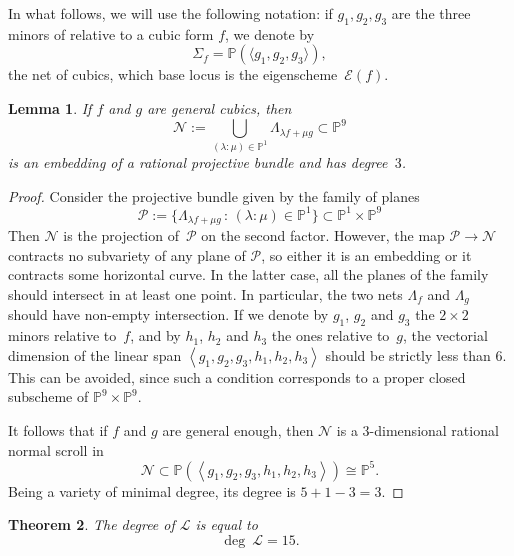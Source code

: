 \documentclass{amsart}
\theoremstyle{plain}
\newtheorem{lemma}{Lemma}[section]
\newtheorem{theorem}[lemma]{Theorem}
\theoremstyle{definition}
\newcommand{\p}{\mathbb{P}}
\newcommand{\Eig}[1]{\mathcal{E}\!\left( {#1} \right)}
\begin{document}
In what follows, we will use the following notation: if $g_1, g_2, g_3$ are the three minors of  relative
to a cubic form $f$, we denote by
$$
\Sigma_f =\p( \langle g_1, g_2, g_3 \rangle),
$$
the net of cubics, which base locus is the eigenscheme~$\Eig{f}$.
%
\begin{lemma}
\label{lemma:scroll}
 If $f$ and $g$ are general cubics, then
 \[
   \mathcal{N} := \bigcup_{(\lambda : \mu) \in \p^1} \Lambda_{\lambda f + \mu g} \subset \p^9
 \]
 is an embedding of a rational projective bundle and has degree~$3$.
\end{lemma}
\begin{proof}
Consider the projective bundle given by the family of planes
%
\[
{\mathcal P} := \{ \Lambda_{\lambda f + \mu g} \, : \, (\lambda: \mu)\in \p^1 \} \subset \p^1 \times \p^9
\]
%
Then $\mathcal{N}$ is the projection of~$\mathcal{P}$ on the second factor.
However, the map ${\mathcal P} \to {\mathcal N}$ contracts no subvariety of any plane of ${\mathcal P}$, so either it is an embedding or it contracts some horizontal curve. In the latter case, all the planes of the family should intersect in at least one point. In particular, the two nets $\Lambda_f$ and $\Lambda_g$ should have non-empty intersection.
If we denote by $g_1$, $g_2$ and $g_3$ the $2 \times 2$ minors relative to~$f$, and by $h_1$, $h_2$ and $h_3$ the ones relative to~$g$, the vectorial dimension of the linear span $\left\langle g_1, g_2, g_3, h_1, h_2, h_3 \right\rangle$ should be strictly less than $6$. This can be avoided, since such a condition corresponds to a proper closed subscheme of $\p^9 \times \p^9$.

It follows that if $f$ and $g$ are general enough, then $\mathcal{N}$ is a $3$-dimensional rational normal scroll in
\[
\mathcal{N} \subset \p(\left\langle g_1, g_2, g_3, h_1, h_2, h_3 \right\rangle) \cong \p^5.
\]
Being a variety of minimal degree, its degree is $5+1-3 = 3$.
\end{proof}

\begin{theorem}
The degree of $\mathcal L$ is equal to
\[
  \deg \ \mathcal L =  15.
\]
\end{theorem}
\end{document}
